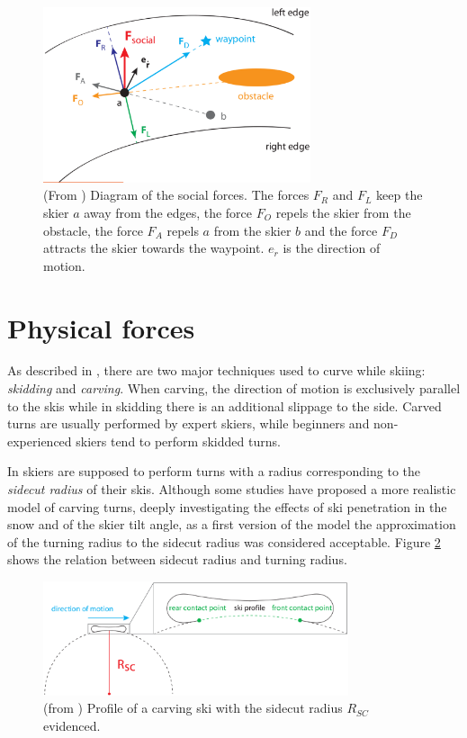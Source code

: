 \documentclass[12pt,a4paper,twoside]{book}
\begin{document}
\begin{figure}
  \begin{center}
    \includegraphics[width=0.7\textwidth]{images/social_forces_dia.eps}
    \caption{(From \cite{hol2012}) Diagram of the social forces. The forces $F_R$ and $F_L$ keep the skier $a$ away from the edges, the force $F_O$ repels the skier from the obstacle, the force $F_A$ repels $a$ from the skier $b$ and the force $F_D$ attracts the skier towards the waypoint. $e_{\dot{r}}$ is the direction of motion.}\label{social_forces_diagram}
  \end{center}
\end{figure}


\section{Physical forces}
As described in \cite{hol2012}, there are two major techniques used to curve while skiing: \textit{skidding} and \textit{carving}. When carving, the direction of motion is exclusively parallel to the skis while in skidding there is an additional slippage to the side. Carved turns are usually performed by expert skiers, while beginners and non-experienced skiers tend to perform skidded turns.

In \cite{hol2012} skiers are supposed to perform turns with a radius corresponding to the \textit{sidecut radius} of their skis. Although some studies \cite{jen2004} \cite{fe2010} have proposed a more realistic model of carving turns, deeply investigating the effects of ski penetration in the snow and of the skier tilt angle, as a first version of the model the approximation of the turning radius to the sidecut radius was considered acceptable. Figure \ref{sidecut_radius} shows the relation between sidecut radius and turning radius.

\begin{figure}
  \begin{center}
    \includegraphics[width=0.8\textwidth]{images/sidecut_radius.eps}
    \caption{(from \cite{hol2012}) Profile of a carving ski with the sidecut radius $R_{SC}$ evidenced.}\label{sidecut_radius}
  \end{center}
\end{figure}
\end{document}
